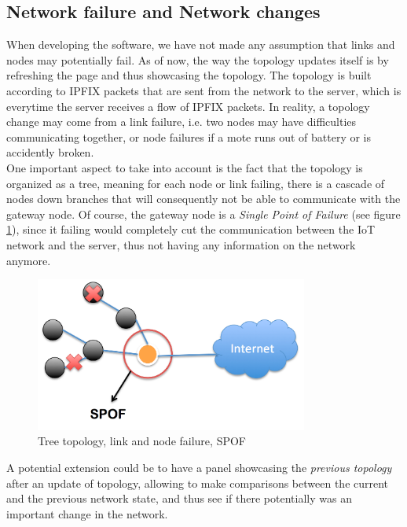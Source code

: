 \subsection*{Network failure and Network changes}

When developing the software, we have not made any assumption that links and nodes may potentially fail. As of now, the way the topology updates itself is by refreshing the page and thus showcasing the topology. The topology is built according to IPFIX packets that are sent from the network to the server, which is everytime the server receives a flow of IPFIX packets. In reality, a topology change may come from a link failure, i.e. two nodes may have difficulties communicating together, or node failures if a mote runs out of battery or is accidently broken. \\

One important aspect to take into account is the fact that the topology is organized as a tree, meaning for each node or link failing, there is a cascade of nodes down branches that will consequently not be able to communicate with the gateway node. Of course, the gateway node is a \textit{Single Point of Failure} (see figure \ref{fig:spof}), since it failing would completely cut the communication between the IoT network and the server, thus not having any information on the network anymore.\\

\begin{figure}[!h]
	\centering
	\includegraphics[width=0.8\textwidth]{res/spof.png}
	\caption{Tree topology, link and node failure, SPOF}
	\label{fig:spof}
\end{figure}

A potential extension could be to have a panel showcasing the \textit{previous topology} after an update of topology, allowing to make comparisons between the current and the previous network state, and thus see if there potentially was an important change in the network.\\

